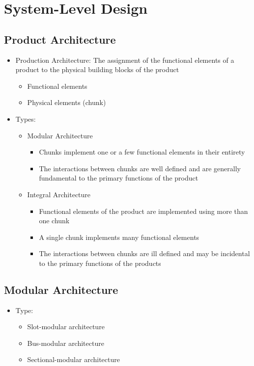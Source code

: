 \documentclass[openany,12pt,a4paper]{book}
\begin{document}
\chapter{System-Level Design}
\section{Product Architecture}
\begin{itemize}
    \item Production Architecture: The assignment of the functional elements of a product to the physical building blocks of the product
    \begin{itemize}
        \item Functional elements
        \item Physical elements (chunk)
    \end{itemize}
    \item Types:
    \begin{itemize}
        \item Modular Architecture
        \begin{itemize}
            \item Chunks implement one or a few functional elements in their entirety
            \item The interactions between chunks are well defined and are generally fundamental to the primary functions of the product
        \end{itemize}
        \item Integral Architecture
        \begin{itemize}
            \item Functional elements of the product are implemented using more than one chunk
            \item A single chunk implements many functional elements
            \item The interactions between chunks are ill defined and may be incidental to the primary functions of the products
        \end{itemize}
    \end{itemize}
\end{itemize}
\section{Modular Architecture}
\begin{itemize}
    \item Type:
    \begin{itemize}
        \item Slot-modular architecture
        \item Bus-modular architecture
        \item Sectional-modular architecture
    \end{itemize}
\end{itemize}
\end{document}
